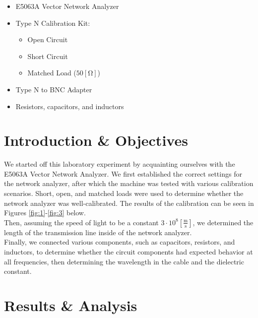 \documentclass[
	letterpaper, %
	10pt, %
]{CSUniSchoolLabReport}
\begin{document}
\begin{itemize}

  \item E5063A Vector Network Analyzer

  \item Type N Calibration Kit:

    \begin{itemize}

      \item Open Circuit

      \item Short Circuit

      \item Matched Load ($50[\si{\ohm}]$)

    \end{itemize}

  \item Type N to BNC Adapter

  \item Resistors, capacitors, and inductors

\end{itemize}

\section{Introduction \& Objectives}

We started off this laboratory experiment by acquainting ourselves with the E5063A Vector Network Analyzer. We first established the correct settings for the network analyzer, after which the machine was tested with various calibration scenarios. Short, open, and matched loads were used to determine whether the network analyzer was well-calibrated. The results of the calibration can be seen in Figures \ref{fig:1}-\ref{fig:3} below. \\

Then, assuming the speed of light to be a constant $3\cdot10^8\left[ \frac{\si{\meter}}{\si{\second}} \right]$, we determined the length of the transmission line inside of the network analyzer. \\

Finally, we connected various components, such as capacitors, resistors, and inductors, to determine whether the circuit components had expected behavior at all frequencies, then determining the wavelength in the cable and the dielectric constant.

\newpage

\section{Results \& Analysis} 
\end{document}
